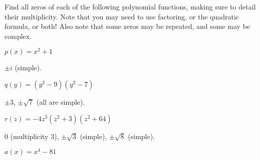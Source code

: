 \begin{exercises}
\begin{problem}
\begin{subproblem}
\begin{shortsolution}
        \end{shortsolution}
    \end{subproblem}
\end{problem}
\begin{problem}[Zeros]
Find all zeros of each of the following polynomial functions, making 
sure to detail their multiplicity. Note that
you may need to use factoring, or the quadratic formula, or both! Also note 
that some zeros may be repeated, and some may be complex.
\begin{multicols}{3}
    \begin{subproblem}
        $p(x)=x^2+1$ 
        \begin{shortsolution}
            $\pm i$ (simple).
        \end{shortsolution}
    \end{subproblem}
    \begin{subproblem}
        $q(y)=(y^2-9)(y^2-7)$ 
        \begin{shortsolution}
         $\pm 3$, $\pm \sqrt{7}$ (all are simple).
        \end{shortsolution}
    \end{subproblem}
    \begin{subproblem}
        $r(z)=-4z^3(z^2+3)(z^2+64)$ 
        \begin{shortsolution}
         $0$ (multiplicity $3$), $\pm\sqrt{3}$ (simple), $\pm\sqrt{8}$ (simple).
        \end{shortsolution}
    \end{subproblem}
    \begin{subproblem}
        $a(x)=x^4-81$ 
        \begin{shortsolution}

\end{shortsolution}
\end{subproblem}
\end{multicols}
\end{problem}
\end{exercises}
